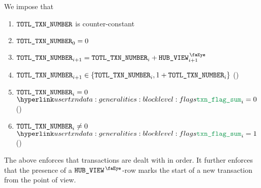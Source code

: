 We impose that
\begin{enumerate}
	\item $\texttt{TOTL}\texttt{\_}\texttt{TXN\_NUMBER}$ is counter-constant
	\item $\texttt{TOTL}\texttt{\_}\texttt{TXN\_NUMBER} _{0} = 0$
	\item $\totalTransactionNumber _{i + 1} = \totalTransactionNumber _{i} + \isUserTxnHubView _{i + 1}$
	\item $\texttt{TOTL}\texttt{\_}\texttt{TXN\_NUMBER} _{i + 1} \in \{ \texttt{TOTL}\texttt{\_}\texttt{TXN\_NUMBER} _{i}, 1 + \texttt{TOTL}\texttt{\_}\texttt{TXN\_NUMBER} _{i} \}$ (\sanityCheck)
	\item \If $\texttt{TOTL}\texttt{\_}\texttt{TXN\_NUMBER} _{i} =    0$ \Then $\transactionFlagSum _{i} = 0$ (\sanityCheck)
	\item \If $\texttt{TOTL}\texttt{\_}\texttt{TXN\_NUMBER} _{i} \neq 0$ \Then $\transactionFlagSum _{i} = 1$ (\sanityCheck)
\end{enumerate}
The above enforces that transactions are dealt with in order.
It further enforces that the presence of a $\isUserTxnHubView$-row marks the start of a new transaction from the \userTxnDataMod{} point of view.
